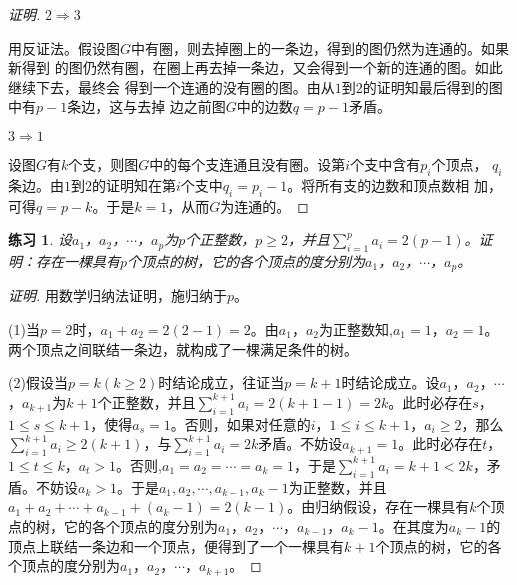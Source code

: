 \documentclass{book}[oneside]
\newtheorem{Thm}{定理}
\newtheorem{Exercise}{练习}
\begin{document}
\begin{CJK*}{UTF8}{gbsn}
\begin{proof}[证明]
    $2\Rightarrow3$

    用反证法。假设图$G$中有圈，则去掉圈上的一条边，得到的图仍然为连通的。如果新得到
的图仍然有圈，在圈上再去掉一条边，又会得到一个新的连通的图。如此继续下去，最终会
得到一个连通的没有圈的图。由从$1$到$2$的证明知最后得到的图中有$p-1$条边，这与去掉
边之前图$G$中的边数$q=p-1$矛盾。


 $3\Rightarrow1$

 设图$G$有$k$个支，则图$G$中的每个支连通且没有圈。设第$i$个支中含有$p_i$个顶点，
$q_i$条边。由$1$到$2$的证明知在第$i$个支中$q_i=p_i-1$。将所有支的边数和顶点数相
加，可得$q = p-k$。于是$k=1$，从而$G$为连通的。
\end{proof}

\begin{Exercise}
  设$a_1$，$a_2$，$\cdots$，$a_p$为$p$个正整数，$p\geq 2$，并且$\sum_{i=1}^pa_i=2(p-1)$。证明：存在一棵具有$p$个顶点的树，它的各个顶点的度分别为$a_1$，$a_2$，$\cdots$，$a_p$。
\end{Exercise}
\begin{proof}[证明]  用数学归纳法证明，施归纳于$p$。

  (1)当$p=2$时，$a_1+a_2=2(2-1)=2$。由$a_1$，$a_2$为正整数知,$a_1=1$，$a_2=1$。两个顶点之间联结一条边，就构成了一棵满足条件的树。

  (2)假设当$p=k(k\geq 2)$时结论成立，往证当$p=k+1$时结论成立。设$a_1$，$a_2$，$\cdots$，$a_{k+1}$为$k+1$个正整数，并且$\sum_{i=1}^{k+1}a_i=2(k+1-1)=2k$。此时必存在$s$，$1\leq s \leq k+1$，使得$a_s=1$。否则，如果对任意的$i$，$1\leq i \leq k+1$，$a_i\geq 2$，那么$\sum_{i=1}^{k+1}a_i\geq 2(k+1)$，与$\sum_{i=1}^{k+1}a_i=2k$矛盾。不妨设$a_{k+1}=1$。此时必存在$t$，$1\leq t \leq k$，$a_t>1$。否则,$a_1=a_2=\cdots=a_k=1$，于是$\sum_{i=1}^{k+1}a_i=k+1<2k$，矛盾。不妨设$a_k>1$。于是$a_1,a_2,\cdots,a_{k-1},a_{k}-1$为正整数，并且$a_1 + a_2 + \cdots + a_{k-1} + (a_{k}-1) = 2(k-1)$。由归纳假设，存在一棵具有$k$个顶点的树，它的各个顶点的度分别为$a_1$，$a_2$，$\cdots$，$a_{k-1}$，$a_k-1$。在其度为$a_k-1$的顶点上联结一条边和一个顶点，便得到了一个一棵具有$k+1$个顶点的树，它的各个顶点的度分别为$a_1$，$a_2$，$\cdots$，$a_{k+1}$。
\end{proof}



\end{CJK*}
\end{document}

